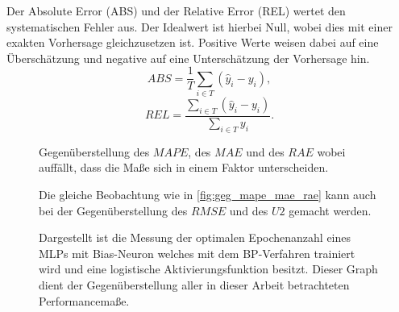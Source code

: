%
%
Der Absolute Error (ABS) und der Relative Error (REL) wertet den systematischen Fehler aus. Der Idealwert ist hierbei Null, wobei dies mit einer exakten Vorhersage gleichzusetzen ist. Positive Werte weisen dabei auf eine Überschätzung und negative auf eine Unterschätzung der Vorhersage hin.\,
%
\begin{equation}
ABS= \frac{1}{T} \sum\limits_{i \in T} (\hat{y}_i-y_i),
\label{gl:ABS}
\end{equation}
%
%
\begin{equation}
REL= \frac{\sum_{i \in T} (\hat{y}_i-y_i)}{\sum_{i \in T} y_i} .
\label{gl:REL}
\end{equation}



\begin{figure}[!htb]
    \centering
        
    \caption{Gegenüberstellung des $MAPE$, des $MAE$ und des $RAE$ wobei auffällt, dass die Maße sich in einem Faktor unterscheiden.}
    \label{fig:geg_mape_mae_rae}
\end{figure}

\begin{figure}[!htb]
    \centering
        
    \caption{Die gleiche Beobachtung wie in \autoref{fig:geg_mape_mae_rae} kann auch bei der Gegenüberstellung des $RMSE$ und des $U2$ gemacht werden.}
    \label{fig:geg_rmse_u2}
\end{figure}

\begin{landscape}
\begin{figure}[!htb]
    \centering
        
    \caption{Dargestellt ist die Messung der optimalen Epochenanzahl eines MLPs mit Bias-Neuron welches mit dem BP-Verfahren trainiert wird und eine logistische Aktivierungsfunktion besitzt. Dieser Graph dient der Gegenüberstellung aller in dieser Arbeit betrachteten Performancemaße.}
    \label{fig:geg_alle}
\end{figure}
\end{landscape}

